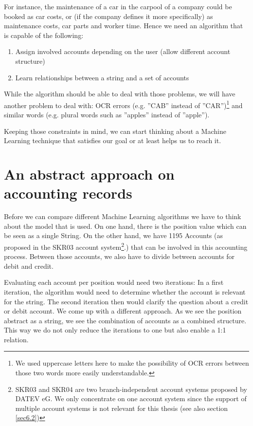 For instance, the maintenance of a car in the carpool of a company could be booked as car costs, or (if the company defines it more specifically) as maintenance costs, car parts and worker time.
Hence we need an algorithm that is capable of the following:
\begin{enumerate}
		\item Assign involved accounts depending on the user (allow different account structure)
		\item Learn relationships between a string and a set of accounts
\end{enumerate}
While the algorithm should be able to deal with those problems, we will have another problem to deal with: OCR errors (e.g. ''CAB'' instead of ''CAR'')\footnote{We used uppercase letters here to make the possibility of OCR errors between those two words more easily understandable.} and similar words (e.g. plural words such as ''apples'' instead of ''apple''). 

Keeping those constraints in mind, we can start thinking about a Machine Learning technique that satisfies our goal or at least helps us to reach it.

\section{An abstract approach on accounting records}
\label{sec4.1}

Before we can compare different Machine Learning algorithms we have to think about the model that is used. On one hand, there is the position value which can be seen as a single String. On the other hand, we have 1195 Accounts (as proposed in the SKR03 account system\cite{datev12}\footnote{SKR03 and SKR04 are two branch-independent account systems proposed by DATEV eG. We only concentrate on one account system since the support of multiple account systems is not relevant for this thesis (see also section \ref{sec6.2})}.) that can be involved in this accounting process. Between those accounts, we also have to divide between accounts for debit and credit.

Evaluating each account per position would need two iterations: In a first iteration, the algorithm would need to determine whether the account is relevant for the string. The second iteration then would clarify the question about a credit or debit account.
We come up with a different approach. As we see the position abstract as a string, we see the combination of accounts as a combined structure. This way we do not only reduce the iterations to one but also enable a 1:1 relation.

